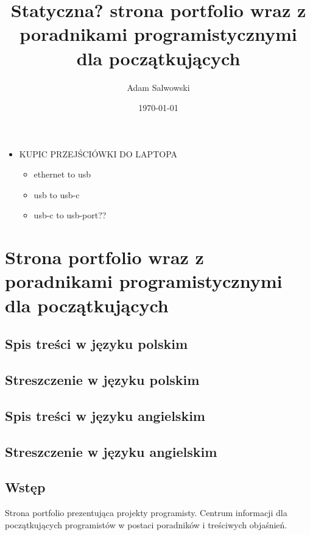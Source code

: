 \documentclass[11pt]{article}
\author{Adam Salwowski}
\date{\today}
\title{Statyczna? strona portfolio wraz z poradnikami programistycznymi dla początkujących}
\begin{document}
\maketitle
\tableofcontents

\begin{itemize}
\item KUPIC PRZEJŚCIÓWKI DO LAPTOPA
\begin{itemize}
\item ethernet to usb
\item usb to usb-c
\item usb-c to usb-port??
\end{itemize}
\end{itemize}

\section{Strona portfolio wraz z poradnikami programistycznymi dla początkujących}
\label{sec:org7bfa714}
\subsection{Spis treści w języku polskim}
\label{sec:orgf11e60e}
\subsection{Streszczenie w języku polskim}
\label{sec:org20c9f4a}
\subsection{Spis treści w języku angielskim}
\label{sec:orgdf31590}
\subsection{Streszczenie w języku angielskim}
\label{sec:org5ad5dc8}
\subsection{Wstęp}
\label{sec:orgece8758}
Strona portfolio prezentująca projekty programisty. Centrum informacji dla początkujących programistów w postaci poradników i treściwych objaśnień.
\end{document}

